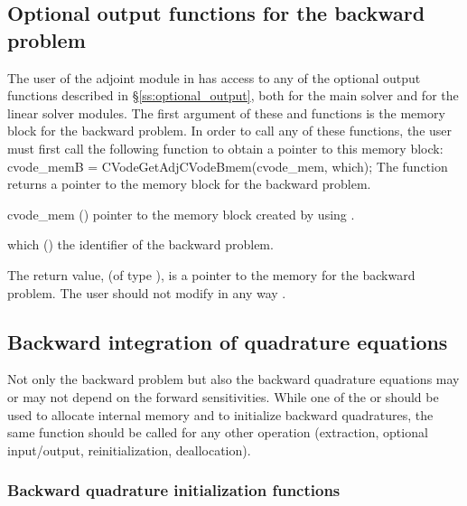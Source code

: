 \subsection{Optional output functions for the backward problem}\label{ss:optional_output_b}
The user of the adjoint module in {\cvodes} has access to any of the optional output 
functions described in \S\ref{ss:optional_output}, both for the main solver and for
the linear solver modules. The first argument of these  and 
functions is the {\cvodes} memory block for the backward problem. In order to call any of these
functions, the user must first call the following function to obtain a pointer to
this memory block:
{
  cvode\_memB = CVodeGetAdjCVodeBmem(cvode\_mem, which);
}
{
  The function  returns a pointer to the {\cvodes}
  memory block for the backward problem.
}
{
  \begin{args}
  \item[cvode\_mem] ()
    pointer to the {\cvodes} memory block created by using .
  \item[which] ()
    the identifier of the backward problem.
  \end{args}
}
{
  The return value,  (of type ), is a pointer to the
  {\cvodes} memory for the backward problem.
}
{
  {\warn}The user should not modify in any way .
}


\subsection{Backward integration of quadrature equations}

Not only the backward problem but also the backward quadrature equations 
may or may not depend on the forward sensitivities. While one of the 
 or  should be used to allocate internal 
memory and to initialize backward quadratures, the same function should be 
called for any other operation (extraction, optional input/output, 
reinitialization, deallocation).

\subsubsection{Backward quadrature initialization functions}
\label{sss:cvquadinitb}

